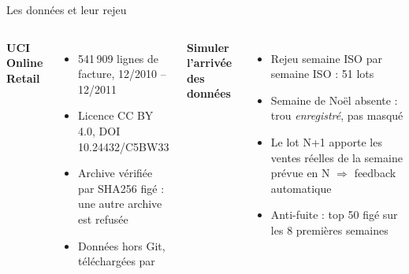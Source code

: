 \documentclass[aspectratio=169,11pt]{beamer}
\newcommand{\code}[1]{\texttt{\detokenize{#1}}}
\begin{document}
\begin{frame}{Les données et leur rejeu}
\begin{columns}[T]
\textbf{UCI Online Retail}
\begin{itemize}
  \item 541\,909 lignes de facture, 12/2010 -- 12/2011
  \item Licence \alert{CC BY 4.0}, DOI 10.24432/C5BW33
  \item Archive vérifiée par \alert{SHA256 figé} : une autre archive est refusée
  \item Données hors Git, téléchargées par \code{retail data}
\end{itemize}
\textbf{Simuler l'arrivée des données}
\begin{itemize}
  \item Rejeu \alert{semaine ISO par semaine ISO} : 51 lots
  \item Semaine de Noël absente : trou \emph{enregistré}, pas masqué
  \item Le lot N+1 apporte les ventes réelles de la semaine prévue en N
        $\Rightarrow$ \alert{feedback automatique}
  \item Anti-fuite : top 50 figé sur les 8 premières semaines
\end{itemize}
\end{columns}
\end{frame}
\end{document}
